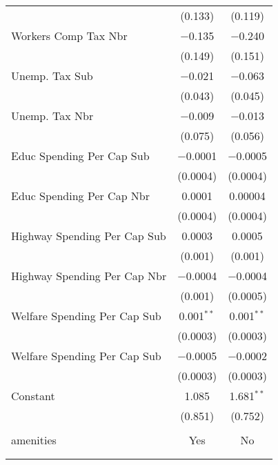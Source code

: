 \begin{table}[!htbp]
\begin{tabular}{@{\extracolsep{5pt}}lcc}
  & (0.133) & (0.119) \\ 
  Workers Comp Tax Nbr & $-$0.135 & $-$0.240 \\ 
  & (0.149) & (0.151) \\ 
  Unemp. Tax Sub & $-$0.021 & $-$0.063 \\ 
  & (0.043) & (0.045) \\ 
  Unemp. Tax Nbr & $-$0.009 & $-$0.013 \\ 
  & (0.075) & (0.056) \\ 
  Educ Spending Per Cap Sub & $-$0.0001 & $-$0.0005 \\ 
  & (0.0004) & (0.0004) \\ 
  Educ Spending Per Cap Nbr & 0.0001 & 0.00004 \\ 
  & (0.0004) & (0.0004) \\ 
  Highway Spending Per Cap Sub & 0.0003 & 0.0005 \\ 
  & (0.001) & (0.001) \\ 
  Highway Spending Per Cap Nbr & $-$0.0004 & $-$0.0004 \\ 
  & (0.001) & (0.0005) \\ 
  Welfare Spending Per Cap Sub & 0.001$^{**}$ & 0.001$^{**}$ \\ 
  & (0.0003) & (0.0003) \\ 
  Welfare Spending Per Cap Sub & $-$0.0005 & $-$0.0002 \\ 
  & (0.0003) & (0.0003) \\ 
  Constant & 1.085 & 1.681$^{**}$ \\ 
  & (0.851) & (0.752) \\ 
 \hline \\[-1.8ex] 
amenities & Yes & No \\ 
\hline \\[-1.8ex] 
\hline 
\hline \\[-1.8ex] 
\end{tabular} 
\end{table} 
